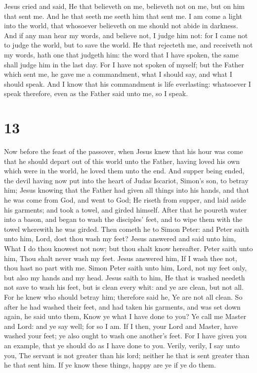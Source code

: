  Jesus cried and said, He that believeth on me, believeth
not on me, but on him that sent me.  And he that seeth me
seeth him that sent me.  I am come a light into the world,
that whosoever believeth on me should not abide in darkness.
 And if any man hear my words, and believe not, I judge him
not: for I came not to judge the world, but to save the world.
 He that rejecteth me, and receiveth not my words, hath one
that judgeth him: the word that I have spoken, the same shall judge him
in the last day.  For I have not spoken of myself; but the
Father which sent me, he gave me a commandment, what I should say, and
what I should speak.  And I know that his commandment is
life everlasting: whatsoever I speak therefore, even as the Father said
unto me, so I speak.

\hypertarget{section-12}{%
\section{13}\label{section-12}}

 Now before the feast of the passover, when Jesus knew that
his hour was come that he should depart out of this world unto the
Father, having loved his own which were in the world, he loved them unto
the end.  And supper being ended, the devil having now put
into the heart of Judas Iscariot, Simon's son, to betray him;
 Jesus knowing that the Father had given all things into his
hands, and that he was come from God, and went to God;  He
riseth from supper, and laid aside his garments; and took a towel, and
girded himself.  After that he poureth water into a bason,
and began to wash the disciples' feet, and to wipe them with the towel
wherewith he was girded.  Then cometh he to Simon Peter: and
Peter saith unto him, Lord, dost thou wash my feet?  Jesus
answered and said unto him, What I do thou knowest not now; but thou
shalt know hereafter.  Peter saith unto him, Thou shalt
never wash my feet. Jesus answered him, If I wash thee not, thou hast no
part with me.  Simon Peter saith unto him, Lord, not my feet
only, but also my hands and my head.  Jesus saith to him,
He that is washed needeth not save to wash his feet, but is clean every
whit: and ye are clean, but not all.  For he knew who
should betray him; therefore said he, Ye are not all clean.
 So after he had washed their feet, and had taken his
garments, and was set down again, he said unto them, Know ye what I have
done to you?  Ye call me Master and Lord: and ye say well;
for so I am.  If I then, your Lord and Master, have washed
your feet; ye also ought to wash one another's feet.  For I
have given you an example, that ye should do as I have done to you.
 Verily, verily, I say unto you, The servant is not greater
than his lord; neither he that is sent greater than he that sent him.
 If ye know these things, happy are ye if ye do them.

